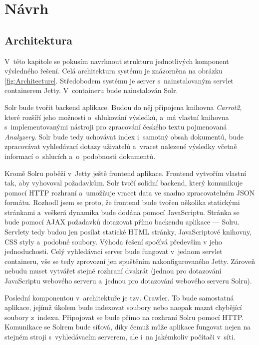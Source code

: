 \chapter{Návrh}
\section{Architektura} \label{arch}
V~této kapitole se pokusím navrhnout strukturu jednotlivých komponent výsledného řešení. Celá architektura systému je znázorněna na obrázku \ref{fig:Architecture}. Středobodem systému je server s~nainstalovaným servlet containerem Jetty. V~containeru bude nainstalován Solr. 

Solr bude tvořit backend aplikace. Budou do něj připojena knihovna \emph{Carrot2}, které rozšíří jeho možnosti o~shlukování výsledků, a~má vlastní knihovna s~implementovanými nástroji pro zpracování českého textu pojmenovaná \emph{Analyzery}. Solr bude tedy uchovávat index i~samotný obsah dokumentů, bude zpracovávat vyhledávací dotazy uživatelů a~vracet nalezené výsledky včetně informací o~shlucích a~o~podobnosti dokumentů.

Kromě Solru poběží v~Jetty ještě frontend aplikace. Frontend vytvořím vlastní tak, aby vyhovoval požadavkům. Solr tvoří solidní backend, který komunikuje pomocí HTTP rozhraní a~umožňuje vracet data ve snadno zpracovatelném JSON formátu. Rozhodl jsem se proto, že frontend bude tvořen několika statickými stránkami a~veškerá dynamika bude dodána pomocí JavaScriptu. Stránka se bude pomocí AJAX požadavků dotazovat přímo backendu aplikace --- Solru. Servlety tedy budou jen posílat statické HTML stránky, JavaScriptové knihovny, CSS styly a~podobné soubory. Výhoda řešení spočívá především v jeho jednoduchosti. Celý vyhledávací server bude fungovat v~jednom servlet containeru, vše se tedy zprovozní jen spuštěním nakonfigurovaného Jetty. Zároveň nebudu muset vytvářet stejné rozhraní dvakrát (jednou pro dotazování JavaScriptu webového serveru a~jednou pro dotazování webového serveru Solru).

Poslední komponentou v~architektuře je tzv. Crawler. To bude samostatná aplikace, jejímž úkolem bude indexovat soubory nebo naopak mazat chybějící soubory z~indexu. Připojovat se bude přímo na rozhraní Solru pomocí HTTP. Komunikace se Solrem bude síťová, díky čemuž může aplikace fungovat nejen na stejném stroji s~vyhledávacím serverem, ale i~na jakémkoliv počítači v~síti.

